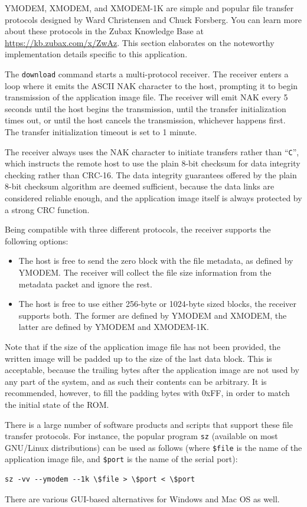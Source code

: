 \documentclass{zubaxdoc}
\begin{document}
YMODEM, XMODEM, and XMODEM-1K are simple and popular file transfer protocols designed by
Ward Christensen and Chuck Forsberg.
You can learn more about these protocols in the Zubax Knowledge Base at \url{https://kb.zubax.com/x/ZwAz}.
This section elaborates on the noteworthy implementation details specific to this application.

The \verb|download| command starts a multi-protocol receiver.
The receiver enters a loop where it emits the ASCII NAK character to the host,
prompting it to begin transmission of the application image file.
The receiver will emit NAK every 5 seconds until the host begins the transmission,
until the transfer initialization times out,
or until the host cancels the transmission, whichever happens first.
The transfer initialization timeout is set to 1 minute.

The receiver always uses the NAK character to initiate transfers rather than ``\verb|C|'',
which instructs the remote host to use the plain 8-bit checksum for data integrity checking
rather than CRC-16.
The data integrity guarantees offered by the plain 8-bit checksum algorithm are deemed sufficient,
because the data links are considered reliable enough,
and the application image itself is always protected by a strong CRC function.

Being compatible with three different protocols, the receiver supports the following options:
\begin{itemize}
    \item The host is free to send the zero block with the file metadata, as defined by YMODEM.
          The receiver will collect the file size information from the metadata packet and ignore the rest.
    
    \item The host is free to use either 256-byte or 1024-byte sized blocks, the receiver supports both.
          The former are defined by YMODEM and XMODEM, the latter are defined by YMODEM and XMODEM-1K.
\end{itemize}

Note that if the size of the application image file has not been provided,
the written image will be padded up to the size of the last data block.
This is acceptable, because the trailing bytes after the application image are
not used by any part of the system, and as such their contents can be arbitrary.
It is recommended, however, to fill the padding bytes with 0xFF,
in order to match the initial state of the ROM.

There is a large number of software products and scripts that support these file transfer protocols.
For instance, the popular program \verb|sz| (available on most GNU/Linux distributions) can be used as follows
(where \verb|$file| is the name of the application image file, and \verb|$port| is the name of the serial port):
\begin{verbatim}
sz -vv --ymodem --1k \$file > \$port < \$port
\end{verbatim}
There are various GUI-based alternatives for Windows and Mac OS as well.
\end{document}
